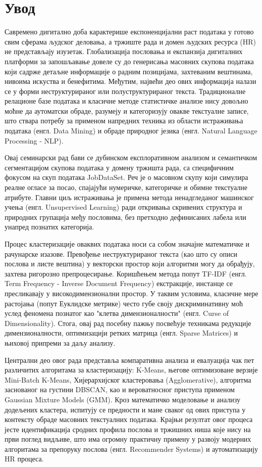 \documentclass[a4paper,12pt]{report}
\begin{document}
	\chapter{Увод}
	Савремено дигитално доба карактерише експоненцијални раст података у готово свим сферама људског деловања, а тржиште рада и домен људских ресурса (HR) не представљају изузетак. Глобализација пословања и експанзија дигиталних платформи за запошљавање довеле су до генерисања масовних скупова података који садрже детаљне информације о радним позицијама, захтеваним вештинама, нивоима искуства и бенефитима. Међутим, највећи део ових информација налази се у форми неструктурираног или полуструктурираног текста. Традиционалне релационе базе података и класичне методе статистичке анализе нису довољно моћне да аутоматски обраде, разумеју и категоризују овакве текстуалне записе, што ствара потребу за применом напредних техника из области истраживања података (енгл. Data Mining) и обраде природног језика (енгл. Natural Language Processing - NLP).
	
	Овај семинарски рад бави се дубинском експлоративном анализом и семантичком сегментацијом скупова података у домену тржишта рада, са специфичним фокусом на скуп података JobDataSet. Реч је о масовном скупу који симулира реалне огласе за посао, спајајући нумеричке, категоричке и обимне текстуалне атрибуте. Главни циљ истраживања је примена метода ненадгледаног машинског учења (енгл. Unsupervised Learning) ради откривања скривених структура и природних групација међу пословима, без претходно дефинисаних лабела или унапред познатих категорија.
	
	Процес кластеризације оваквих података носи са собом значајне математичке и рачунарске изазове. Превођење неструктурираног текста (као што су описи послова и листе вештина) у векторски простор који алгоритми могу да обрађују, захтева ригорозно препроцесирање. Коришћењем метода попут TF-IDF (енгл. Term Frequency - Inverse Document Frequency) екстракције, инстанце се пресликавају у високодимензионални простор. У таквим условима, класичне мере растојања (попут Еуклидске метрике) често губе своју дискриминативну моћ услед феномена познатог као "клетва димензионалности" (енгл. Curse of Dimensionality). Стога, овај рад посебну пажњу посвећује техникама редукције димензионалности, оптимизацији ретких матрица (енгл. Sparse Matrices) и њиховој припреми за даљу анализу.
	
	Централни део овог рада представља компаративна анализа и евалуација чак пет различитих алгоритама за кластеризацију: K-Means, његове оптимизоване верзије Mini-Batch K-Means, Хијерархијског кластеровања (Agglomerative), алгоритма заснованог на густини DBSCAN, као и вероватносног приступа применом Gaussian Mixture Models (GMM). Кроз математичко моделовање и анализу додељених кластера, испитују се предности и мане сваког од ових приступа у контексту обраде масовних текстуалних података. Крајњи резултат овог процеса јесте идентификација сродних профила послова и тржишних ниша које нису на први поглед видљиве, што има огромну практичну примену у развоју модерних алгоритама за препоруку послова (енгл. Recommender Systems) и аутоматизацију HR процеса.
	
\end{document}

